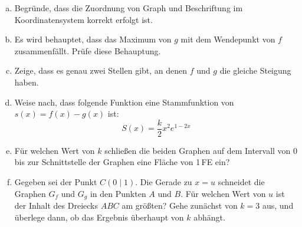\begin{exercise}
\begin{center}
    \end{center}
    \begin{enumerate}[a)]
      \item Begründe, dass die Zuordnung von Graph und Beschriftung
            im Koordinatensystem korrekt erfolgt ist.
      \item Es wird behauptet, dass das Maximum von $g$ mit dem
            Wendepunkt von $f$ zusammenfällt. Prüfe diese Behauptung.
      \item Zeige, dass es genau zwei Stellen gibt, an denen $f$ und $g$
            die gleiche Steigung haben.
      \item Weise nach, dass folgende Funktion eine Stammfunktion
            von $s(x)=f(x)-g(x)$ ist:
            \begin{equation*}
              S(x)=\frac{k}{2}x^2e^{1-2x}
            \end{equation*}
      \item Für welchen Wert von $k$ schließen die beiden Graphen auf dem
            Intervall von 0 bis zur Schnittstelle der Graphen eine Fläche
            von 1\,FE ein?
      \item Gegeben sei der Punkt $C(0\mid1)$.
            Die Gerade zu $x=u$ schneidet die Graphen $G_f$ und $G_g$
            in den Punkten $A$ und $B$. Für welchen Wert von $u$ ist der
            Inhalt des Dreiecks $ABC$ am größten? Gehe zunächst von $k=3$ aus,
            und überlege dann, ob das Ergebnis überhaupt von $k$ abhängt.
    \end{enumerate}
  \fi
\end{exercise}
